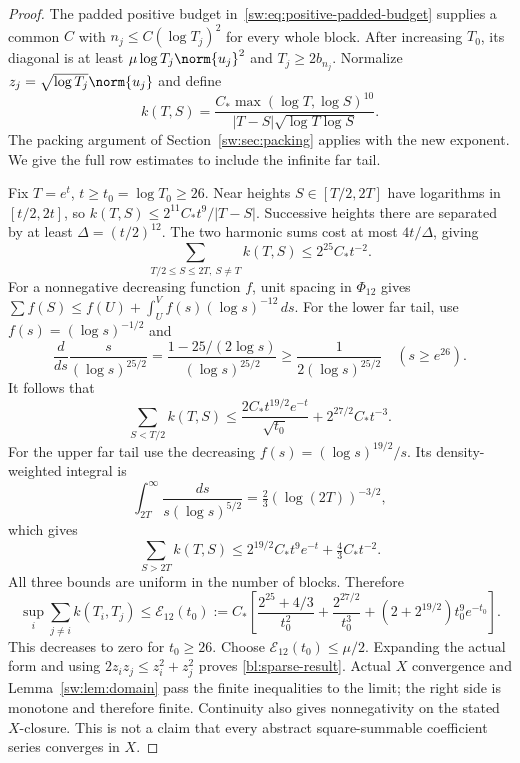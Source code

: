 \documentclass[11pt,a4paper]{article}
\numberwithin{equation}{section}
\theoremstyle{definition}\newtheorem{definition}[theorem]{Definition}
\theoremstyle{remark}\newtheorem{remark}[theorem]{Remark}
\begin{document}
\begin{proof}
The padded positive budget in~\eqref{sw:eq:positive-padded-budget} supplies a common $C$ with $n_j\le C(\log T_j)^2$ for every whole block. After increasing $T_0$, its diagonal is at least $\mu\log T_j\norm{u_j}^2$ and $T_j\ge2b_{n_j}$. Normalize $z_j=\sqrt{\log T_j}\norm{u_j}$ and define
\begin{equation}
 k(T,S)=\frac{C_*\max(\log T,\log S)^{10}}
 {|T-S|\sqrt{\log T\log S}}.
\end{equation}
The packing argument of Section~\ref{sw:sec:packing} applies with the new exponent. We give the full row estimates to include the infinite far tail.

Fix $T=e^t$, $t\ge t_0=\log T_0\ge26$. Near heights $S\in[T/2,2T]$ have logarithms in $[t/2,2t]$, so $k(T,S)\le2^{11}C_*t^9/|T-S|$. Successive heights there are separated by at least $\Delta=(t/2)^{12}$. The two harmonic sums cost at most $4t/\Delta$, giving
\begin{equation}
 \sum_{T/2\le S\le2T,\ S\ne T}k(T,S)\le2^{25}C_*t^{-2}.
\end{equation}
For a nonnegative decreasing function $f$, unit spacing in $\Phi_{12}$ gives
$\sum f(S)\le f(U)+\int_U^V f(s)(\log s)^{-12}\,ds$.
For the lower far tail, use $f(s)=(\log s)^{-1/2}$ and
\begin{equation}
 \frac{d}{ds}\frac{s}{(\log s)^{25/2}}
 =\frac{1-25/(2\log s)}{(\log s)^{25/2}}
 \ge\frac1{2(\log s)^{25/2}}\quad(s\ge e^{26}).
\end{equation}
It follows that
\begin{equation}
 \sum_{S<T/2} k(T,S)
 \le\frac{2C_*t^{19/2}e^{-t}}{\sqrt{t_0}}+2^{27/2}C_*t^{-3}.
\end{equation}
For the upper far tail use the decreasing $f(s)=(\log s)^{19/2}/s$. Its density-weighted integral is
\begin{equation}
 \int_{2T}^\infty\frac{ds}{s(\log s)^{5/2}}
 =\tfrac23(\log(2T))^{-3/2},
\end{equation}
which gives
\begin{equation}
 \sum_{S>2T} k(T,S)\le2^{19/2}C_*t^9e^{-t}+\tfrac43 C_*t^{-2}.
\end{equation}
All three bounds are uniform in the number of blocks. Therefore
\begin{equation}\label{bl:E12}
 \sup_i\sum_{j\ne i}k(T_i,T_j)\le\mathcal E_{12}(t_0):=
 C_*\left[\frac{2^{25}+4/3}{t_0^2}+\frac{2^{27/2}}{t_0^3}
 +(2+2^{19/2})t_0^9e^{-t_0}\right].
\end{equation}
This decreases to zero for $t_0\ge26$. Choose $\mathcal E_{12}(t_0)\le\mu/2$. Expanding the actual form and using $2z_iz_j\le z_i^2+z_j^2$ proves \eqref{bl:sparse-result}. Actual $X$ convergence and Lemma~\ref{sw:lem:domain} pass the finite inequalities to the limit; the right side is monotone and therefore finite. Continuity also gives nonnegativity on the stated $X$-closure. This is not a claim that every abstract square-summable coefficient series converges in $X$.
\end{proof}
\end{document}
